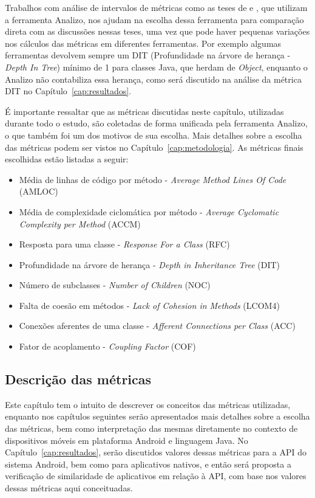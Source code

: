 Trabalhos com análise de intervalos de métricas como as teses de  e , que utilizam a ferramenta Analizo, nos ajudam na escolha dessa ferramenta para comparação direta com as discussões nessas teses, uma vez que pode haver pequenas variações nos cálculos das métricas em diferentes ferramentas. Por exemplo algumas ferramentas devolvem sempre um DIT (Profundidade na árvore de herança - \textit{Depth In Tree}) mínimo de 1 para classes Java, que herdam de \textit{Object}, enquanto o Analizo não contabiliza essa herança, como será discutido na análise da métrica DIT no Capítulo~\ref{cap:resultados}.

É importante ressaltar que as métricas discutidas neste capítulo, utilizadas durante todo o estudo, são coletadas de forma unificada pela ferramenta Analizo, o que também foi um dos motivos de sua escolha. Mais detalhes sobre a escolha das métricas podem ser vistos no Capítulo~\ref{cap:metodologia}. As métricas finais escolhidas estão listadas a seguir:

\begin{itemize}
\item Média de linhas de código por método - \textit{Average Method Lines Of Code} (AMLOC)
\item Média de complexidade ciclomática por método - \textit{Average Cyclomatic Complexity per Method} (ACCM)
\item Resposta para uma classe - \textit{Response For a Class} (RFC)
\item Profundidade na árvore de herança - \textit{Depth in Inheritance Tree} (DIT)
\item Número de subclasses - \textit{Number of Children} (NOC)
\item Falta de coesão em métodos - \textit{Lack of Cohesion in Methods} (LCOM4)
\item Conexões aferentes de uma classe - \textit{Afferent Connections per Class} (ACC)
\item Fator de acoplamento - \textit{Coupling Factor} (COF)
\end{itemize}

\subsection{Descrição das métricas}

Este capítulo tem o intuito de descrever os conceitos das métricas utilizadas, enquanto nos capítulos seguintes serão apresentados mais detalhes sobre a escolha das métricas, bem como interpretação das mesmas diretamente no contexto de dispositivos móveis em plataforma Android e linguagem Java. No Capítulo~\ref{cap:resultados}, serão discutidos valores dessas métricas para a API do sistema Android, bem como para aplicativos nativos, e então será proposta a verificação de similaridade de aplicativos em relação à API, com base nos valores dessas métricas aqui conceituadas.

